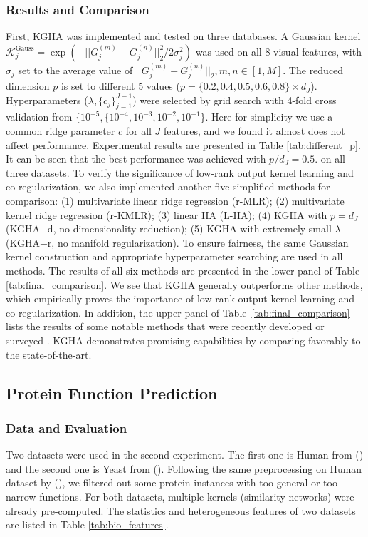\documentclass[a4paper]{article}
\begin{document}
\subsubsection{Results and Comparison}
First, KGHA was implemented and tested on three databases. A Gaussian kernel 
$\mathcal{K}^{\textrm{Gauss}}_j=\exp (-||G_j^{(m)}-G_j^{(n)}||_2^2/2\sigma^2_j)$ 
was used on all 8 visual features, with $\sigma_j$ set to the average value of $||G_j^{(m)}-G_j^{(n)}||_2, 
m,n\in[1,M]$. The reduced dimension $p$ is set to different 5 values ($p=\{0.2, 0.4,0.5, 0.6,0.8\}\times d_J$). 
Hyperparameters ($\lambda, \{c_j\}_{j=1}^{J-1}$) were selected by grid search with 4-fold cross validation from  
$\{10^{-5}, \{10^{-4},10^{-3},10^{-2},10^{-1}\}$. Here for simplicity we use a common ridge parameter $c$ for all $J$ features, and we found it almost does not 
affect performance. Experimental results are presented in Table \ref{tab:different_p}. It can be seen that the best performance was achieved with $p/d_J=0.5$.   
on all three datasets. 
To verify the significance of low-rank output kernel learning and co-regularization, we also implemented another five simplified methods for  
comparison: (1) multivariate linear ridge regression (r-MLR); (2) multivariate kernel ridge regression (r-KMLR); (3) linear HA (L-HA);    
(4) KGHA with $p=d_J$ (KGHA$-$d, no dimensionality reduction);  (5) KGHA with extremely small $\lambda$ (KGHA$-$r, no manifold regularization).  
To ensure fairness, the same Gaussian kernel construction and appropriate hyperparameter searching are used in all methods. The results of all six methods are presented in 
the lower panel of Table \ref{tab:final_comparison}. We see that KGHA generally outperforms other methods, which empirically proves the importance of
low-rank output kernel learning and co-regularization.  
In addition, the upper panel of Table~\ref{tab:final_comparison} lists
the results of some notable methods that were recently developed or
surveyed \cite{GMVS09,baseline,chen_2013_icml}. KGHA demonstrates
promising capabilities by comparing favorably to the state-of-the-art.

\subsection{Protein Function Prediction}
\subsubsection{Data and Evaluation}
Two datasets were used in the second experiment. 
The first one is \textsf{Human} from \citeauthor{Mostafavi_2010_Bioinfo} (\citeyear{Mostafavi_2010_Bioinfo}) and the 
second one is \textsf{Yeast} from \citeauthor{Tsuda_2005_BioInfor} (\citeyear{Tsuda_2005_BioInfor}). Following the same preprocessing on \textsf{Human} dataset 
by \citeauthor{Yu_2013_TBioinfo} (\citeyear{Yu_2013_TBioinfo}), we filtered out some protein instances with too general or too narrow functions. For both datasets, 
multiple kernels (similarity networks) were already pre-computed. The statistics and heterogeneous features of two datasets are listed in Table \ref{tab:bio_features}. 
\end{document}
